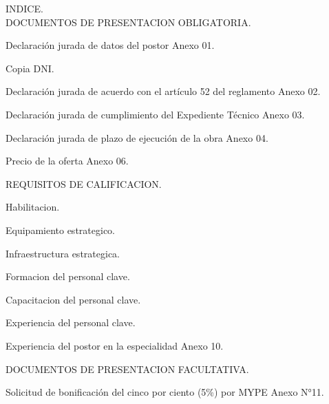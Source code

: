 \begin{spacing}{1.5}
INDICE.\\

DOCUMENTOS DE PRESENTACION OBLIGATORIA.\dotfill

Declaración jurada de datos del postor Anexo 01.\dotfill

Copia DNI.\dotfill

Declaración jurada de acuerdo con el artículo 52 del reglamento Anexo 02.\dotfill

Declaración jurada de cumplimiento del Expediente Técnico Anexo 03.\dotfill

Declaración jurada de plazo de ejecución de la obra Anexo 04.\dotfill

Precio de la oferta Anexo 06.\dotfill

REQUISITOS DE CALIFICACION.\dotfill

Habilitacion.\dotfill

Equipamiento estrategico.\dotfill

Infraestructura estrategica.\dotfill

Formacion del personal clave.\dotfill

Capacitacion del personal clave.\dotfill

Experiencia del personal clave.\dotfill

Experiencia del postor en la especialidad Anexo 10.\dotfill

DOCUMENTOS DE PRESENTACION FACULTATIVA.\dotfill

Solicitud de bonificación del cinco por ciento (5\%) por MYPE Anexo N°11.\dotfill
	
\end{spacing}